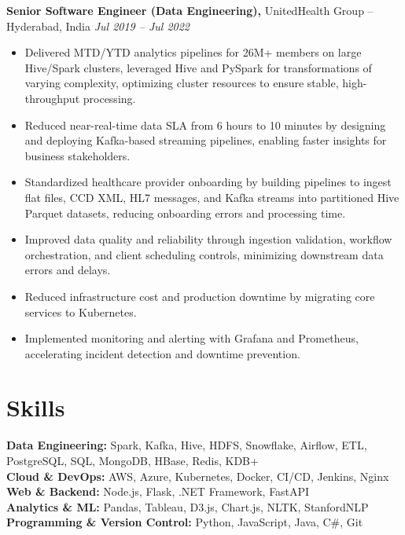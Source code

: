 \documentclass[10pt]{article}
\begin{document}
\textbf{Senior Software Engineer (Data Engineering),} UnitedHealth Group -- Hyderabad, India \hfill \textit{Jul 2019 -- Jul 2022} \\
\vspace{0pt}
\begin{itemize}
  \item Delivered MTD/YTD analytics pipelines for 26M+ members on large Hive/Spark clusters, leveraged Hive and PySpark for transformations of varying complexity, optimizing cluster resources to ensure stable, high-throughput processing.
  \item Reduced near-real-time data SLA from 6 hours to 10 minutes by designing and deploying Kafka-based streaming pipelines, enabling faster insights for business stakeholders.
  \item Standardized healthcare provider onboarding by building pipelines to ingest flat files, CCD XML, HL7 messages, and Kafka streams into partitioned Hive Parquet datasets, reducing onboarding errors and processing time.
  \item Improved data quality and reliability through ingestion validation, workflow orchestration, and client scheduling controls, minimizing downstream data errors and delays.
  \item Reduced infrastructure cost and production downtime by migrating core services to Kubernetes.
  \item Implemented monitoring and alerting with Grafana and Prometheus, accelerating incident detection and downtime prevention.
\end{itemize}

\vspace{0pt}

\section*{Skills}
\textbf{Data Engineering:} Spark, Kafka, Hive, HDFS, Snowflake, Airflow, ETL, PostgreSQL, SQL, MongoDB, HBase, Redis, KDB+ \\
\textbf{Cloud \& DevOps:} AWS, Azure, Kubernetes, Docker, CI/CD, Jenkins, Nginx \\
\textbf{Web \& Backend:} Node.js, Flask, .NET Framework, FastAPI \\
\textbf{Analytics \& ML:} Pandas, Tableau, D3.js, Chart.js, NLTK, StanfordNLP \\
\textbf{Programming \& Version Control:} Python, JavaScript, Java, C\#, Git

\vspace{0pt}
\end{document}
